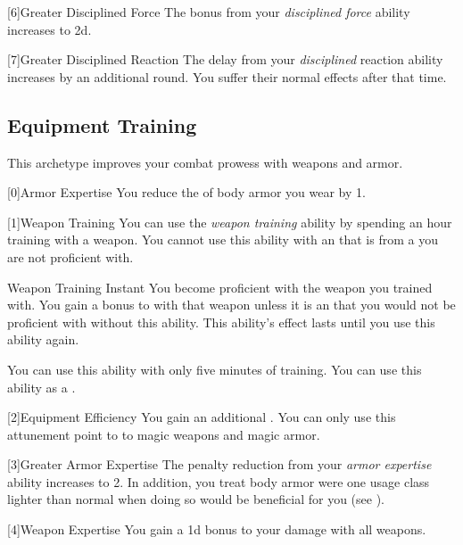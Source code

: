         [6]{Greater Disciplined Force} The bonus from your \textit{disciplined force} ability increases to \plus2d.

        [7]{Greater Disciplined Reaction}
        The delay from your \textit{disciplined} reaction ability increases by an additional round.
        You suffer their normal effects after that time.

    \newpage
    \subsection{Equipment Training}
        This archetype improves your combat prowess with weapons and armor.

        [0]{Armor Expertise} You reduce the  of body armor you wear by 1.

        [1]{Weapon Training} You can use the \textit{weapon training} ability by spending an hour training with a weapon.
        You cannot use this ability with an  that is from a  you are not proficient with.
        \begin{instantability}{Weapon Training}
            Instant
            \rankline
            You become proficient with the weapon you trained with.
            You gain a  bonus to  with that weapon unless it is an  that you would not be proficient with without this ability.
            This ability's effect lasts until you use this ability again.

            \rankline
             You can use this ability with only five minutes of training.
             You can use this ability as a .
        \end{instantability}

        [2]{Equipment Efficiency} You gain an additional .
        You can only use this attunement point to  to magic weapons and magic armor.

        [3]{Greater Armor Expertise}
        The penalty reduction from your \textit{armor expertise} ability increases to 2.
        In addition, you treat body armor were one usage class lighter than normal when doing so would be beneficial for you (see ).

        [4]{Weapon Expertise} You gain a \plus1d bonus to your damage with all weapons.

